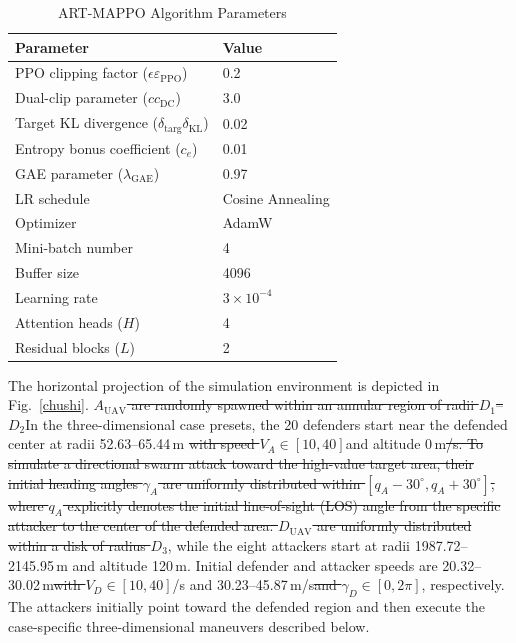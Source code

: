 \documentclass[lettersize,journal]{IEEEtran}
\providecommand{\DIFadd}[1]{{\protect\color{blue}#1}} %
\providecommand{\DIFdel}[1]{{\protect\color{red}\sout{#1}}}                      %
\providecommand{\DIFaddbegin}{} %
\providecommand{\DIFaddend}{} %
\providecommand{\DIFdelbegin}{} %
\providecommand{\DIFdelend}{} %
\providecommand{\DIFaddFL}[1]{\DIFadd{#1}} %
\providecommand{\DIFdelFL}[1]{\DIFdel{#1}} %
\providecommand{\DIFaddbeginFL}{} %
\providecommand{\DIFaddendFL}{} %
\providecommand{\DIFdelbeginFL}{} %
\providecommand{\DIFdelendFL}{} %
\newcommand{\DIFscaledelfig}{0.5}
\newlength{\DIFdelgraphicswidth} %
\newlength{\DIFdelgraphicsheight} %
\newcommand{\DIFaddincludegraphics}[2][]{{\color{blue}\fbox{\DIFOincludegraphics[#1]{#2}}}} %
\newcommand{\DIFdelincludegraphics}[2][]{%
\sbox{\DIFdelgraphicsbox}{\DIFOincludegraphics[#1]{#2}}%
\settoboxwidth{\DIFdelgraphicswidth}{\DIFdelgraphicsbox} %
\settoboxtotalheight{\DIFdelgraphicsheight}{\DIFdelgraphicsbox} %
\scalebox{\DIFscaledelfig}{%
\parbox[b]{\DIFdelgraphicswidth}{\usebox{\DIFdelgraphicsbox}\\[-\baselineskip] \rule{\DIFdelgraphicswidth}{0em}}\llap{\resizebox{\DIFdelgraphicswidth}{\DIFdelgraphicsheight}{%
\setlength{\unitlength}{\DIFdelgraphicswidth}%
\begin{picture}(1,1)%
\thicklines\linethickness{2pt} %
{\color[rgb]{1,0,0}\put(0,0){\framebox(1,1){}}}%
{\color[rgb]{1,0,0}\put(0,0){\line( 1,1){1}}}%
{\color[rgb]{1,0,0}\put(0,1){\line(1,-1){1}}}%
\end{picture}%
}\hspace*{3pt}}} %
} %
\DeclareRobustCommand{\DIFaddbegin}{\DIFOaddbegin \let\includegraphics\DIFaddincludegraphics} %
\DeclareRobustCommand{\DIFaddend}{\DIFOaddend \let\includegraphics\DIFOincludegraphics} %
\DeclareRobustCommand{\DIFdelbegin}{\DIFOdelbegin \let\includegraphics\DIFdelincludegraphics} %
\DeclareRobustCommand{\DIFdelend}{\DIFOaddend \let\includegraphics\DIFOincludegraphics} %
\DeclareRobustCommand{\DIFaddbeginFL}{\DIFOaddbeginFL \let\includegraphics\DIFaddincludegraphics} %
\DeclareRobustCommand{\DIFaddendFL}{\DIFOaddendFL \let\includegraphics\DIFOincludegraphics} %
\DeclareRobustCommand{\DIFdelbeginFL}{\DIFOdelbeginFL \let\includegraphics\DIFdelincludegraphics} %
\DeclareRobustCommand{\DIFdelendFL}{\DIFOaddendFL \let\includegraphics\DIFOincludegraphics} %
\begin{document}
\begin{table}[!t]
\centering
\renewcommand{\arraystretch}{1.4}
\caption{ART-MAPPO Algorithm Parameters}
\label{table2}
\begin{tabular}{ll}
\hline\hline
Parameter & Value \\ \hline
PPO clipping factor (\DIFdelbeginFL \DIFdelFL{$\epsilon$}\DIFdelendFL \DIFaddbeginFL \DIFaddFL{$\varepsilon_{\mathrm{PPO}}$}\DIFaddendFL ) & 0.2 \\
Dual-clip parameter (\DIFdelbeginFL \DIFdelFL{$c$}\DIFdelendFL \DIFaddbeginFL \DIFaddFL{$c_{\mathrm{DC}}$}\DIFaddendFL ) & 3.0 \\
Target KL divergence (\DIFdelbeginFL \DIFdelFL{$\delta_{\text{targ}}$}\DIFdelendFL \DIFaddbeginFL \DIFaddFL{$\delta_{\mathrm{KL}}$}\DIFaddendFL ) & 0.02 \\
Entropy bonus coefficient ($c_e$) & 0.01 \\
GAE parameter ($\lambda_{\mathrm{GAE}}$) & 0.97 \\
LR schedule & Cosine Annealing \\
Optimizer & AdamW \\
Mini-batch number & 4 \\
Buffer size & 4096 \\
Learning rate & $3\times10^{-4}$ \\
Attention heads ($H$) & 4 \\
Residual blocks ($L$) & 2 \\ \hline
\end{tabular}
\end{table}


The \DIFaddbegin \DIFadd{horizontal projection of the }\DIFaddend simulation environment is depicted in Fig.~\ref{chushi}.
\DIFdelbegin \DIFdel{$A_{\text{UAV}}$ are randomly spawned within an annular region of radii $D_1$--$D_2$}\DIFdelend \DIFaddbegin \DIFadd{In the three-dimensional case presets, the 20 defenders start near the defended center at
radii 52.63--65.44}\DIFaddend \,m \DIFdelbegin \DIFdel{with speed
$V_A\in[10,40]$}\DIFdelend \DIFaddbegin \DIFadd{and altitude 0}\DIFaddend \,m\DIFdelbegin \DIFdel{/s. To simulate a directional swarm attack toward the high-value target area, their initial heading angles $\gamma_A$ are uniformly distributed within $[q_A-30^\circ, q_A+30^\circ]$, where $q_A$ explicitly denotes the initial line-of-sight (LOS) angle from the specific attacker to the center of the defended area. $D_{\text{UAV}}$ are
uniformly distributed within a disk of radius $D_3$}\DIFdelend \DIFaddbegin \DIFadd{, while the eight attackers start at radii
1987.72--2145.95\,m and altitude 120\,m. Initial defender and attacker speeds are
20.32--30.02}\DIFaddend \,m\DIFdelbegin \DIFdel{with
$V_D\in[10,40]$}\DIFdelend \DIFaddbegin \DIFadd{/s and 30.23--45.87}\DIFaddend \,m/s\DIFdelbegin \DIFdel{and $\gamma_D\in[0,2\pi]$}\DIFdelend \DIFaddbegin \DIFadd{, respectively. The attackers initially point toward
the defended region and then execute the case-specific three-dimensional maneuvers described
below}\DIFaddend .
\end{document}
